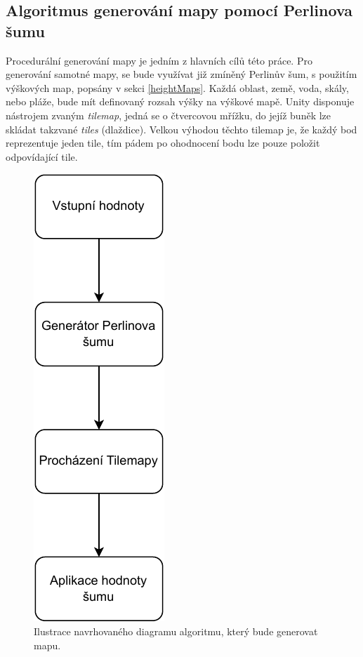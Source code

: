 \newpage
\subsection{Algoritmus generování mapy pomocí Perlinova šumu}
Procedurální generování mapy je jedním z hlavních cílů této práce. Pro generování samotné mapy, se bude využívat již zmíněný Perlinův šum, s použitím výškových map, popsány v sekci \ref{heightMaps}. Každá oblast, země, voda, skály, nebo pláže, bude mít definovaný rozsah výšky na výškové mapě. Unity disponuje nástrojem zvaným \textit{tilemap}, jedná se o čtvercovou mřížku, do jejíž buněk lze skládat takzvané \textit{tiles} (dlaždice). Velkou výhodou těchto tilemap je, že každý bod reprezentuje jeden tile, tím pádem po ohodnocení bodu lze pouze položit odpovídající tile.

\begin{figure}[H]
	\centering
	\includegraphics[scale=0.9]{obrazky-figures/generation.pdf}
	\caption{Ilustrace navrhovaného diagramu algoritmu, který bude generovat mapu.}
	\label{AlgoritmusDiagram}
\end{figure}

